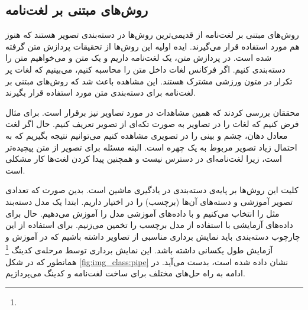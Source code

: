 \documentclass[11pt]{article}
\begin{document}
\subsection{روش‌های مبتنی بر لغت‌نامه}\label{sec:img_class:vocab_based}
روش‌های مبتنی بر لغت‌نامه از قدیمی‌ترین روش‌ها در دسته‌بندی تصویر هستند که هنوز هم مورد استفاده قرار می‌گیرند. ایده اولیه این روش‌ها از تحقیقات پردازش متن گرفته شده است. در پردازش متن، یک لغت‌نامه داریم و یک متن  و می‌خواهیم متن را دسته‌بندی کنیم. اگر فرکانس لغات داخل متن را محاسبه کنیم، می‌بینیم که لغات پر تکرار در متون ورزشی مشترک هستند. این مشاهده باعث شد که روش‌های مبتنی بر لغت‌نامه برای دسته‌بندی متن مورد استفاده قرار بگیرند.

محققان بررسی کردند که همین مشاهدات در مورد تصاویر نیز برقرار است. برای مثال فرض کنیم که لغات را در تصاویر به صورت تکه‌ای از تصویر تعریف کنیم. حال اگر لغت معادل دهان، چشم و بینی را در تصویری مشاهده کنیم می‌توانیم نتیجه بگیریم که به احتمال زیاد تصویر مربوط به یک چهره است. البته مسئله برای تصویر از متن پیچیده‌تر است، زیرا لغت‌نامه‌ای در دسترس نیست و همچنین پیدا کردن لغت‌ها کار مشکلی است.

کلیت این روش‌ها بر پایه‌ی دسته‌بندی در یادگیری ماشین است. بدین صورت که تعدادی تصویر آموزشی و دسته‌های آن‌ها (برچسب) را در اختیار داریم. ابتدا یک مدل دسته‌بند مثل
 \cite{svm}
را انتخاب می‌کنیم و با داده‌های آموزشی مدل را آموزش می‌دهیم. حال برای داده‌های آزمایشی با استفاده از مدل برچسب را تخمین می‌زنیم. برای استفاده از این چارچوب دسته‌بندی باید نمایش برداری مناسبی از تصاویر داشته باشیم که در آموزش و آزمایش طول یکسانی داشته باشد. این نمایش برداری توسط مرحله‌ی کدینگ
\footnote{}
همانطور که در شکل
\ref{fig:img_class:pipe}
نشان داده شده است، بدست می‌آید.
در ادامه به راه حل‌های مختلف برای ساخت لغت‌نامه و کدینگ می‌پردازیم.
\end{document}
